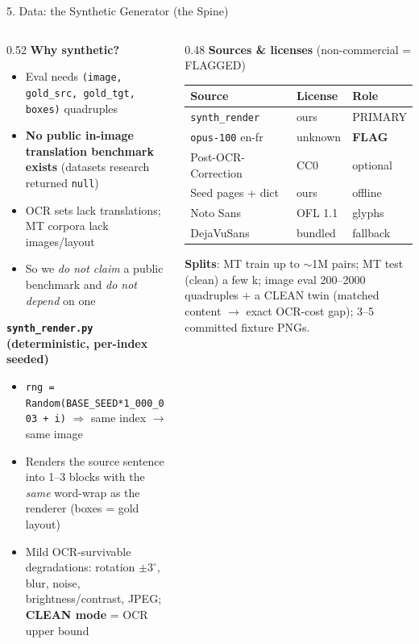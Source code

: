 \documentclass[10pt,aspectratio=169]{beamer}
\begin{document}
\begin{frame}{5. Data: the Synthetic Generator (the Spine)}
\begin{columns}[T]
\begin{column}{0.52\textwidth}
\textbf{Why synthetic?}
\begin{itemize}\scriptsize
  \item Eval needs \texttt{(image, gold\_src, gold\_tgt, boxes)} quadruples
  \item \textbf{No public in-image translation benchmark exists} (datasets research returned \texttt{null})
  \item OCR sets lack translations; MT corpora lack images/layout
  \item So we \emph{do not claim} a public benchmark and \emph{do not depend} on one
\end{itemize}

\textbf{\texttt{synth\_render.py} (deterministic, per-index seeded)}
\begin{itemize}\scriptsize
  \item \texttt{rng = Random(BASE\_SEED*1\_000\_003 + i)} $\Rightarrow$ same index $\rightarrow$ same image
  \item Renders the source sentence into 1--3 blocks with the \emph{same} word-wrap as the renderer (boxes = gold layout)
  \item Mild OCR-survivable degradations: rotation $\pm3^\circ$, blur, noise, brightness/contrast, JPEG; \textbf{CLEAN mode} = OCR upper bound
\end{itemize}
\end{column}
\begin{column}{0.48\textwidth}
\textbf{Sources \& licenses} {\scriptsize(non-commercial = FLAGGED)}
\begin{table}[h]
\centering\scriptsize
\begin{tabular}{lll}
\toprule
\textbf{Source} & \textbf{License} & \textbf{Role} \\
\midrule
\texttt{synth\_render} & ours & PRIMARY \\
\texttt{opus-100} en-fr & unknown & \textbf{FLAG} \\
Post-OCR-Correction & CC0 & optional \\
Seed pages + dict & ours & offline \\
Noto Sans & OFL 1.1 & glyphs \\
DejaVuSans & bundled & fallback \\
\bottomrule
\end{tabular}
\end{table}
\scriptsize \textbf{Splits}: MT train up to $\sim$1M pairs; MT test (clean) a few k; image eval 200--2000 quadruples + a CLEAN twin (matched content $\rightarrow$ exact OCR-cost gap); 3--5 committed fixture PNGs.


\end{column}
\end{columns}
\end{frame}
\end{document}
